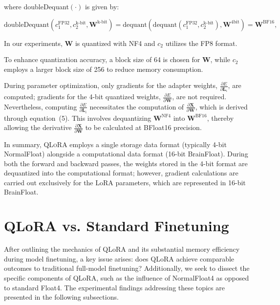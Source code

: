 where doubleDequant$(\cdot)$ is given by:

\begin{equation}
    \text{doubleDequant}(c_1^{\text{FP32}}, c_2^{\text{k-bit}}, \mathbf{W}^{\text{k-bit}}) = \text{dequant}(\text{dequant}(c_1^{\text{FP32}}, c_2^{\text{k-bit}}), \mathbf{W}^{\text{4bit}}) = \mathbf{W}^{\text{BF16}},
\end{equation}

In our experiments, $\mathbf{W}$ is quantized with NF4 and $c_2$ utilizes the FP8 format.

To enhance quantization accuracy, a block size of 64 is chosen for $\mathbf{W}$, while $c_2$ employs a larger block size of 256 to reduce memory consumption.

During parameter optimization, only gradients for the adapter weights, $\frac{\partial E}{\partial \mathbf{L}_i}$, are computed; gradients for the 4-bit quantized weights, $\frac{\partial E}{\partial \mathbf{W}}$, are not required. Nevertheless, computing $\frac{\partial E}{\partial \mathbf{L}_i}$ necessitates the computation of $\frac{\partial \mathbf{X}}{\partial \mathbf{W}}$, which is derived through equation~(5). This involves dequantizing $\mathbf{W}^{\text{NF4}}$ into $\mathbf{W}^{\text{BF16}}$, thereby allowing the derivative $\frac{\partial \mathbf{X}}{\partial \mathbf{W}}$ to be calculated at BFloat16 precision.

In summary, \textsc{QLoRA} employs a single storage data format (typically 4-bit NormalFloat) alongside a computational data format (16-bit BrainFloat). During both the forward and backward passes, the weights stored in the 4-bit format are dequantized into the computational format; however, gradient calculations are carried out exclusively for the LoRA parameters, which are represented in 16-bit BrainFloat.

\section{QLoRA vs. Standard Finetuning}
\label{sec:comp_to_std}

After outlining the mechanics of QLoRA and its substantial memory efficiency during model finetuning, a key issue arises: does QLoRA achieve comparable outcomes to traditional full-model finetuning? Additionally, we seek to dissect the specific components of QLoRA, such as the influence of NormalFloat4 as opposed to standard Float4. The experimental findings addressing these topics are presented in the following subsections.

